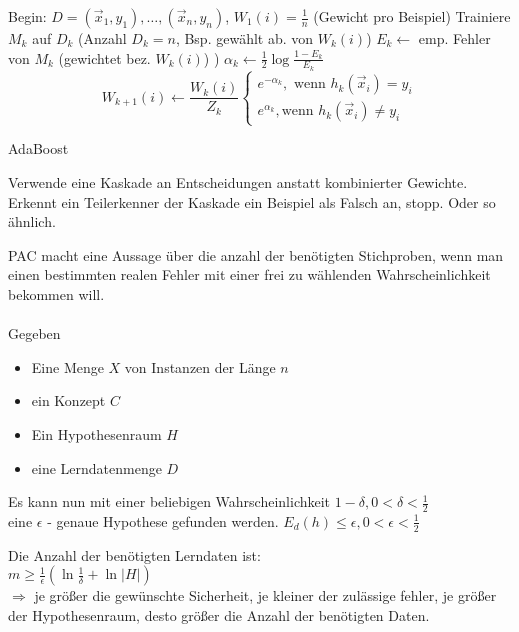 \begin{algorithm}[H]
    \begin{algorithmic}
        \State Begin: $D = {(\vec{x}_1,y_1),\dots,(\vec{x}_n,y_n)}$, $W_1(i) = \frac{1}{n}$ (Gewicht pro Beispiel)
        \State Trainiere $M_k$ auf $D_k$ (Anzahl $D_k = n$, Bsp. gewählt ab. von $W_k(i)$)
        \State $E_k \leftarrow$ emp. Fehler von $M_k$ (gewichtet bez. $W_k(i)$) )
        \State $\alpha_k \leftarrow \frac{1}{2} \log \frac{1-E_k}{E_k}$
        \begin{equation}W_{k+1}(i) \leftarrow \frac{W_k(i)}{Z_k}\begin{cases}
            e^{-\alpha_k}, \text{ wenn } h_k(\vec{x}_i) = y_i \\
                                                            e^{\alpha_k}, \text{wenn } h_k(\vec{x}_i) \neq y_i
                                                        \end{cases}\end{equation}
        \EndFor
        \caption{AdaBoost}
    \end{algorithmic}
\end{algorithm}

Verwende eine Kaskade an Entscheidungen anstatt kombinierter Gewichte.
Erkennt ein Teilerkenner der Kaskade ein Beispiel als Falsch an, stopp. Oder so
ähnlich.

PAC macht eine Aussage über die anzahl der benötigten Stichproben, wenn
man einen bestimmten realen Fehler mit einer frei zu wählenden Wahrscheinlichkeit
bekommen will.\\\\

Gegeben
\begin{itemize}
    \item Eine Menge $X$ von Instanzen der Länge $n$
    \item ein Konzept $C$
    \item Ein Hypothesenraum $H$
    \item eine Lerndatenmenge $D$
\end{itemize}
Es kann nun mit einer beliebigen Wahrscheinlichkeit $1-\delta, 0<\delta<\frac{1}{2}$ \\
eine $\epsilon$ - genaue Hypothese gefunden werden. $E_d(h) \leq \epsilon, 0<\epsilon<\frac{1}{2}$

Die Anzahl der benötigten Lerndaten ist: \\
$m \geq \frac{1}{\epsilon}(\ln\frac{1}{\delta}+\ln|H|)$ \\
$\Rightarrow$ je größer die gewünschte Sicherheit, je kleiner der zulässige fehler, je größer
der Hypothesenraum, desto größer die Anzahl der benötigten Daten.

